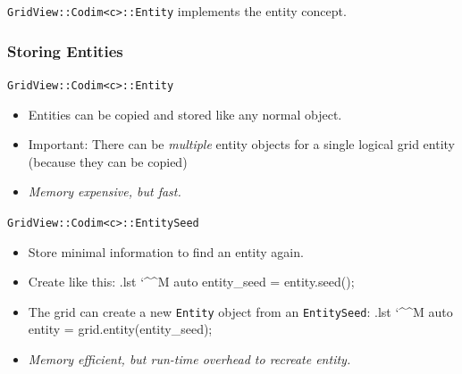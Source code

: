 \documentclass[ignorenonframetext,11pt]{beamer}
\makeatletter
\theoremstyle{definition}
\newenvironment{codeblock}{%
  \begin{tcolorbox}[size=small,oversize,boxrule=0pt,colframe=white]}{%
  \end{tcolorbox}}
\newenvironment{cppcode}{%
  \begingroup
  \@bsphack
  \immediate\openout\lstvrb@out\jobname.lst
  \let\do\@makeother\dospecials\catcode`\^^M\active
  \def\verbatim@processline{%
    \immediate\write\lstvrb@out{\the\verbatim@line}}%
  \verbatim@start}{%
  \immediate\closeout\lstvrb@out
  \@esphack
  \endgroup
  \begin{codeblock}
    
  \end{codeblock}}
\makeatother
\begin{document}
\begin{frame}
  \pause
  \lstinline!GridView::Codim<c>::Entity!
  implements the entity concept.

\end{frame}

\begin{frame}[fragile]
  \frametitle{Storing Entities}

  \vfill

  \pause
  \lstinline!GridView::Codim<c>::Entity!
  \begin{itemize}
  \item Entities can be copied and stored like any normal object.
  \item Important: There can be \emph{multiple} entity objects for a single logical grid entity (because they can be copied)
  \item \emph{Memory expensive, but fast.}
  \end{itemize}

  \vfill

  \pause

  \lstinline!GridView::Codim<c>::EntitySeed!


  \begin{itemize}
  \item Store minimal information to find an entity again.
  \item Create like this:
    \begin{cppcode}
      auto entity_seed = entity.seed();
    \end{cppcode}
  \item The grid can create a new \lstinline!Entity! object from an \lstinline!EntitySeed!:
    \begin{cppcode}
      auto entity = grid.entity(entity_seed);
    \end{cppcode}
  \item \emph{Memory efficient, but run-time overhead to recreate entity.}
  \end{itemize}

\end{frame}

\end{document}
